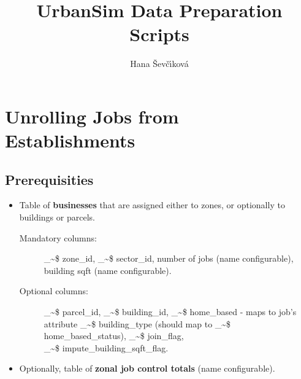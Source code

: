 \documentclass[11pt]{article}
\title{UrbanSim Data Preparation Scripts}
\author{Hana \v{S}ev\v{c}\'{\i}kov\'{a}}
\makeatletter
\newcommand\code{\bgroup\@makeother\_\@makeother\~\@makeother\$\@codex}
\def\@codex#1{{\normalfont\ttfamily\hyphenchar\font=-1 #1}\egroup}
\makeatother
\begin{document}
\maketitle


\section{Unrolling Jobs from Establishments}
\label{sec:unrollbusiness}
%
\subsection{Prerequisities}
%
\begin{itemize}
\item Table of {\bf businesses} that are assigned either to zones, or optionally to buildings or parcels. 
	\begin{description}
	\item[Mandatory columns:] \code{zone_id}, \code{sector_id}, number of jobs (name configurable), building sqft  (name configurable).
	\item[Optional columns:] \code{parcel_id}, \code{building_id}, \code{home_based} - maps to job's attribute \code{building_type} (should map to \code{home_based_status}), \code{join_flag},\\ \code{impute_building_sqft_flag}.
	\end{description}
\item Optionally, table of {\bf zonal job control totals} (name configurable).
\end{itemize}
\end{document}
